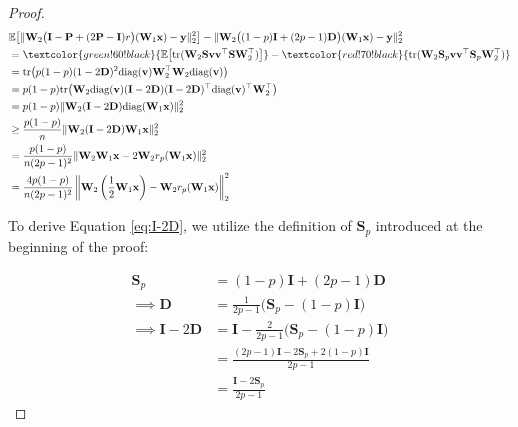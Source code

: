 \begin{proof}
\begin{align}
    &\mathbb{E}\big[\|\mathbf{W}_2 \big(\mathbf{I} - \mathbf{P} + (2\mathbf{P} - \mathbf{I})r\big)(\mathbf{W}_1 \mathbf{x}) - \mathbf{y}\|_2^2 \big] 
    - \|\mathbf{W}_2 \big((1-p)\mathbf{I} + (2p-1)\mathbf{D}\big)(\mathbf{W}_1 \mathbf{x}) - \mathbf{y}\|_2^2 \nonumber \\
    &= \textcolor{green!60!black}{\mathbb{E}\big[\text{tr}(\mathbf{W}_2 \mathbf{S} \mathbf{v} \mathbf{v}^\top \mathbf{S} \mathbf{W}_2^\top) \big]} 
    - \textcolor{red!70!black}{\text{tr}(\mathbf{W}_2 \mathbf{S}_p \mathbf{v} \mathbf{v}^\top \mathbf{S}_p \mathbf{W}_2^\top)} \nonumber \\
    &= \text{tr}\big(p(1-p)(1-2\mathbf{D})^2 \text{diag}(\mathbf{v}) \mathbf{W}_2^\top \mathbf{W}_2 \text{diag}(\mathbf{v})\big) \nonumber \\
    &= p(1-p) \text{tr}\big(\mathbf{W}_2 \text{diag}(\mathbf{v})(\mathbf{I} - 2\mathbf{D})(\mathbf{I} - 2\mathbf{D})^\top \text{diag}(\mathbf{v})^\top \mathbf{W}_2^\top\big) \nonumber \\
    &= p(1-p)  \|\mathbf{W}_2 (\mathbf{I} - 2\mathbf{D}) \text{diag}(\mathbf{W}_1 \mathbf{x})\|_2^2\nonumber \\
    &\geq \frac{p(1-p)}{n} \|\mathbf{W}_2 (\mathbf{I} - 2\mathbf{D}) \mathbf{W}_1 \mathbf{x}\|_2^2  \label{eq:wrong_on_dropact} 
 \\
    &= \frac{p(1-p)}{n(2p-1)^2} \|\mathbf{W}_2 \mathbf{W}_1 \mathbf{x} - 2\mathbf{W}_2 r_p(\mathbf{W}_1 \mathbf{x})\|_2^2 \label{eq:I-2D} \\
    &= \frac{4p(1-p)}{n(2p-1)^2} \left\|\mathbf{W}_2 \left(\frac{1}{2}\mathbf{W}_1 \mathbf{x}\right) - \mathbf{W}_2 r_p(\mathbf{W}_1 \mathbf{x})\right\|_2^2 \nonumber
\end{align}

    


    To derive Equation \eqref{eq:I-2D}, we utilize the definition of $\mathbf{S}_p$ introduced at the beginning of the proof:

    \begin{align*}
    \mathbf{S}_p &= (1-p)\mathbf{I} + (2p-1)\mathbf{D} \\
    \implies \mathbf{D} &= \frac{1}{2p-1}\big(\mathbf{S}_p - (1-p)\mathbf{I}\big) \\
    \implies \mathbf{I} - 2\mathbf{D} &= \mathbf{I} - \frac{2}{2p-1}\big(\mathbf{S}_p - (1-p)\mathbf{I}\big) \\
    &= \frac{(2p-1)\mathbf{I} - 2\mathbf{S}_p + 2(1-p)\mathbf{I}}{2p-1} \\
    &= \frac{\mathbf{I} - 2\mathbf{S}_p}{2p-1}
\end{align*}




\end{proof}
